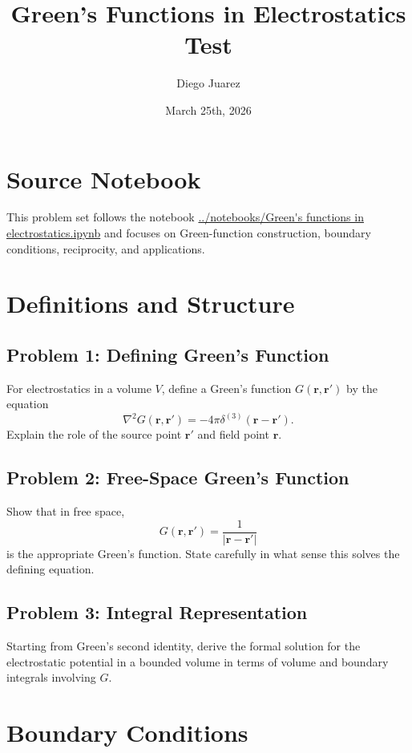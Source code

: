 \documentclass[hidelinks]{article}
\title{\textbf{Green's Functions in Electrostatics Test}}
\author{Diego Juarez}
\date{March 25th, 2026}
\begin{document}
\hypersetup{bookmarksnumbered=true}
\pagecolor{black}
\color{white}
\maketitle

\begin{Large}
\tableofcontents
\end{Large}
\pagebreak

\section{Source Notebook}
This problem set follows the notebook
\url{../notebooks/Green's functions in electrostatics.ipynb}
and focuses on Green-function construction, boundary conditions, reciprocity, and applications.

\section{Definitions and Structure}
\subsection{Problem 1: Defining Green's Function}
For electrostatics in a volume $V$, define a Green's function $G(\mathbf{r},\mathbf{r}')$ by the equation
\[
\nabla^2 G(\mathbf{r},\mathbf{r}')=-4\pi \delta^{(3)}(\mathbf{r}-\mathbf{r}').
\]
Explain the role of the source point $\mathbf{r}'$ and field point $\mathbf{r}$.

\subsection{Problem 2: Free-Space Green's Function}
Show that in free space,
\[
G(\mathbf{r},\mathbf{r}')=\frac{1}{|\mathbf{r}-\mathbf{r}'|}
\]
is the appropriate Green's function. State carefully in what sense this solves the defining equation.

\subsection{Problem 3: Integral Representation}
Starting from Green's second identity, derive the formal solution for the electrostatic potential in a bounded volume in terms of volume and boundary integrals involving $G$.

\section{Boundary Conditions}
\end{document}
